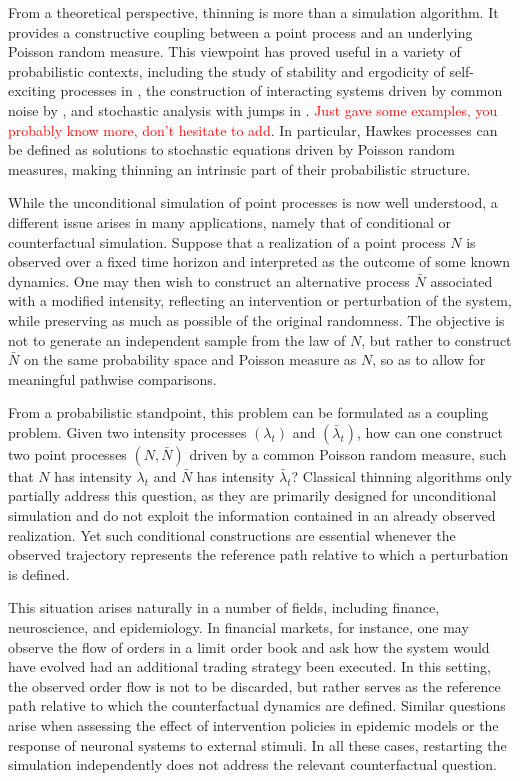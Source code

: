 \documentclass{article} %
\newcommand{\1}{\mathbbm{1}} %
\begin{document}
From a theoretical perspective, thinning is more than a simulation algorithm. It provides a constructive coupling between a point process and an underlying Poisson random measure. This viewpoint has proved useful in a variety of probabilistic contexts, including the study of stability and ergodicity of self-exciting processes in \citet{bremaud1996stability}, the construction of interacting systems driven by common noise by \citet{bremaud1981point}, and stochastic analysis with jumps in \citet{jacod2012discretization}. \textcolor{red}{Just gave some examples, you probably know more, don't hesitate to add}. In particular, Hawkes processes can be defined as solutions to stochastic equations driven by Poisson random measures, making thinning an intrinsic part of their probabilistic structure.

While the unconditional simulation of point processes is now well understood, a different issue arises in many applications, namely that of conditional or counterfactual simulation. Suppose that a realization of a point process $N$ is observed over a fixed time horizon and interpreted as the outcome of some known dynamics. One may then wish to construct an alternative process $\bar N$ associated with a modified intensity, reflecting an intervention or perturbation of the system, while preserving as much as possible of the original randomness. The objective is not to generate an independent sample from the law of $N$, but rather to construct $\bar N$ on the same probability space and Poisson measure as $N$, so as to allow for meaningful pathwise comparisons.

From a probabilistic standpoint, this problem can be formulated as a coupling problem. Given two intensity processes $(\lambda_t)$ and $(\bar\lambda_t)$, how can one construct two point processes $(N,\bar N)$ driven by a common Poisson random measure, such that $N$ has intensity $\lambda_t$ and $\bar N$ has intensity $\bar\lambda_t$? Classical thinning algorithms only partially address this question, as they are primarily designed for unconditional simulation and do not exploit the information contained in an already observed realization. Yet such conditional constructions are essential whenever the observed trajectory represents the reference path relative to which a perturbation is defined.

This situation arises naturally in a number of fields, including finance, neuroscience, and epidemiology. In financial markets, for instance, one may observe the flow of orders in a limit order book and ask how the system would have evolved had an additional trading strategy been executed. In this setting, the observed order flow is not to be discarded, but rather serves as the reference path relative to which the counterfactual dynamics are defined. Similar questions arise when assessing the effect of intervention policies in epidemic models or the response of neuronal systems to external stimuli. In all these cases, restarting the simulation independently does not address the relevant counterfactual question.
\end{document}
